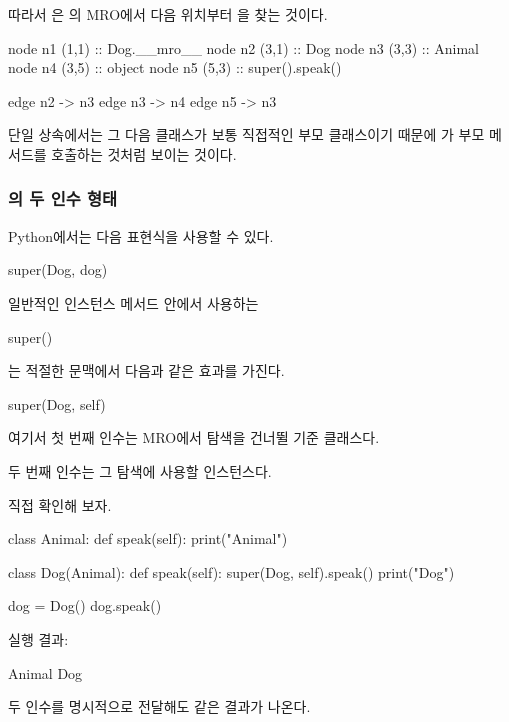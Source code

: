 따라서 은 의 MRO에서 다음 위치부터 을 찾는 것이다.

\begin{dhkdiagram}[in=6]
node n1 (1,1) :: Dog.__mro__
node n2 (3,1) :: Dog
node n3 (3,3) :: Animal
node n4 (3,5) :: object
node n5 (5,3) :: super().speak()

edge n2 -> n3
edge n3 -> n4
edge n5 -> n3
\end{dhkdiagram}

단일 상속에서는 그 다음 클래스가 보통 직접적인 부모 클래스이기 때문에 가 부모 메서드를 호출하는 것처럼 보이는 것이다.

\subsubsection{의 두 인수 형태}

Python에서는 다음 표현식을 사용할 수 있다.

\begin{dhkcode}
super(Dog, dog)
\end{dhkcode}

일반적인 인스턴스 메서드 안에서 사용하는

\begin{dhkcode}
super()
\end{dhkcode}

는 적절한 문맥에서 다음과 같은 효과를 가진다.

\begin{dhkcode}
super(Dog, self)
\end{dhkcode}

여기서 첫 번째 인수는 MRO에서 탐색을 건너뛸 기준 클래스다.

두 번째 인수는 그 탐색에 사용할 인스턴스다.

직접 확인해 보자.

\begin{dhkcode}
class Animal:
    def speak(self):
        print("Animal")


class Dog(Animal):
    def speak(self):
        super(Dog, self).speak()
        print("Dog")

dog = Dog()
dog.speak()
\end{dhkcode}

실행 결과:

\begin{dhkzsh}
Animal
Dog
\end{dhkzsh}

두 인수를 명시적으로 전달해도 같은 결과가 나온다.

